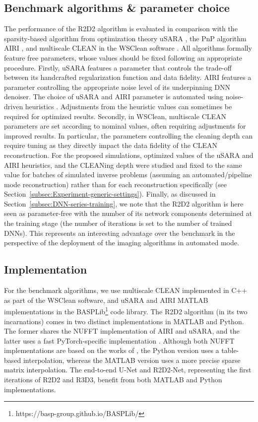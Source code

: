 \documentclass[preprint2,twocolumn]{aastex631}
\begin{document}
\subsection{Benchmark algorithms \& parameter choice}
The performance of the R2D2 algorithm is evaluated in comparison with the sparsity-based algorithm from optimization theory uSARA \citep{repetti2020forward,terris2022}, the PnP algorithm AIRI \citep{terris2022,terris2023plug}, and multiscale CLEAN \citep{cornwell2008multiscale} in the WSClean software \citep{offringa2014,offringa2017}. All algorithms formally feature free parameters, whose values should be fixed following an appropriate procedure. Firstly, uSARA features a parameter that controls the trade-off between its handcrafted regularization function and data fidelity. AIRI features a parameter controlling the appropriate noise level of its underpinning DNN denoiser. The choice of uSARA and AIRI parameter is automated using noise-driven heuristics \citep{terris2022,dabbech2022,wilber23a}. Adjustments from the heuristic values can sometimes be required for optimized results. Secondly, in WSClean, multiscale CLEAN parameters are set according to nominal values, often requiring adjustments for improved results. In particular, the parameters controlling the cleaning depth can require tuning as they directly impact the data fidelity of the CLEAN reconstruction. For the proposed simulations, optimized values of the uSARA and AIRI heuristics, and the CLEANing depth were studied and fixed to the same value for batches of simulated inverse problems (assuming an automated/pipeline mode reconstruction) rather than for each reconstruction specifically (see Section~\ref{subsec:Experiment-generic-settings}). Finally, as discussed in Section~\ref{subsec:DNN-series-training}, we note that the R2D2 algorithm is here seen as parameter-free with the number of its network components determined at the training stage {(the number of iterations is set to the number of trained DNNs).} This represents an interesting advantage over the benchmark in the perspective of the deployment of the imaging algorithms in automated mode.

\subsection{Implementation}
For the benchmark algorithms, we use multiscale CLEAN implemented in C++ as part of the WSClean software, and uSARA and AIRI MATLAB implementations in the {BASPLib}\footnote{https://basp-group.github.io/BASPLib/} code library. The R2D2 algorithm (in its two incarnations) comes in two distinct implementations in MATLAB and Python. The former shares the NUFFT implementation of AIRI and uSARA, and the latter uses a fast PyTorch-specific implementation \citep{muckley20}. Although both NUFFT implementations are based on the works of \citet{Fessler2003}, the Python version uses a table-based interpolation, whereas the MATLAB version uses a more precise sparse matrix interpolation. The end-to-end U-Net and R2D2-Net, representing the first iterations of R2D2 and R3D3, benefit from both MATLAB and Python implementations.
\end{document}
